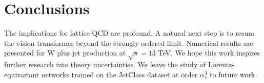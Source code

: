 \section{Conclusions}\label{sec:conclusions}

The implications for lattice QCD are profound. A natural next step is to
resum the vision transformer beyond the strongly ordered limit.
Numerical results are presented for W plus jet production at $\sqrt{s} =
13$ TeV. We hope this work inspires further research into theory
uncertainties. We leave the study of Lorentz-equivariant networks
trained on the JetClass dataset at order $\alpha_s^3$ to future work.

